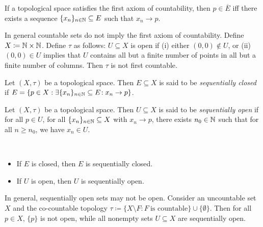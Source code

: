 \documentclass{techreport}
\begin{document}
\begin{lemma}\label{Lem:FirstCountLimitOfSeqIffClosure}
	If a topological space satisfies the first axiom of countability, then $p \in \overline{E}$ iff there exists a sequence $\{x_n\}_{n \in \mathbb{N}} \subseteq E$ such that $x_n \rightarrow p$.
\end{lemma}

\begin{example}\label{Exa:CountableNotImplyFstCountable}
	In general countable sets do not imply the first axiom of countability.
	Define $X \coloneqq \mathbb{N} \times \mathbb{N}$.
	Define $\tau$ as follows: $U \subseteq X$ is open if (i) either $(0,0) \not\in U$, or (ii) $(0,0) \in U$ implies that $U$ contains all but a finite number of points in all but a finite number of columns.
	Then $\tau$ is not first countable.
\end{example}

\begin{definition}\label{De:SequentiallyClosed}
	Let $(X,\tau)$ be a topological space.
	Then $E \subseteq X$ is said to be \emph{sequentially closed} if $E = \{ p \in X : \exists {\{x_n\}_{n \in \mathbb{N}} \subseteq E }\!: x_n \rightarrow p \}$.
\end{definition}

\begin{definition}\label{De:SequentiallyOpen}
	Let $(X,\tau)$ be a topological space.
	Then $U \subseteq X$ is said to be \emph{sequentially open} if for all $p \in U$, for all $\{x_n\}_{n \in \mathbb{N}} \subseteq X$ with $x_n \rightarrow p$, there exists $n_0 \in \mathbb{N}$ such that for all $n \ge n_0$, we have $x_n \in U$.
\end{definition}

\begin{remark}\label{Rem:ClosedOpenImplySeqClosedOpen}\
	\begin{itemize}
		\item If $E$ is closed, then $E$ is sequentially closed.
		\item If $U$ is open, then $U$ is sequentially open.
	\end{itemize}
\end{remark}

\begin{remark}\label{Rem:SeqOpenNotOpen}
	In general, sequentially open sets may not be open.
	Consider an uncountable set $X$ and the co-countable topology $\tau \coloneqq \{ X \setminus F : F~\text{is countable} \} \cup \{ \emptyset \}$.
	Then for all $p \in X$, $\{p\}$ is not open, while all nonempty sets $U \subseteq X$ are sequentially open.
\end{remark}
\end{document}
